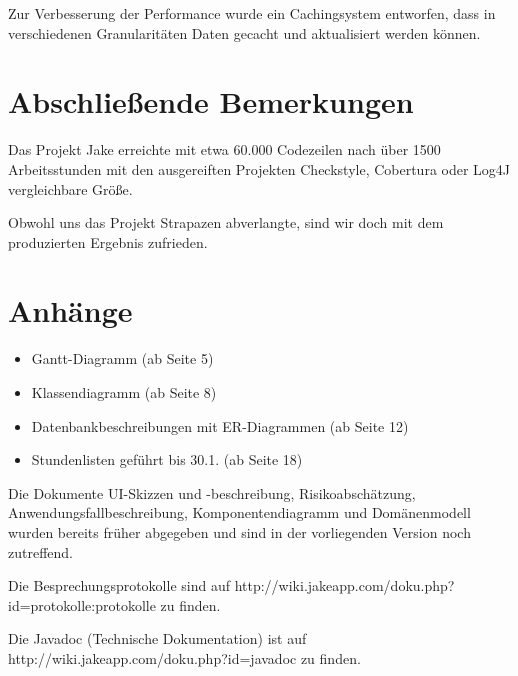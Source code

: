 Zur Verbesserung der Performance wurde ein Cachingsystem entworfen, dass in verschiedenen Granularitäten Daten gecacht und aktualisiert werden können.


\section{Abschließende Bemerkungen}
Das Projekt Jake erreichte mit etwa 60.000 Codezeilen nach über 1500 Arbeitsstunden mit den ausgereiften Projekten Checkstyle, Cobertura oder Log4J vergleichbare Größe.

Obwohl uns das Projekt Strapazen abverlangte, sind wir doch mit dem produzierten Ergebnis zufrieden.

\section{Anhänge}
\begin{itemize}
\item Gantt-Diagramm (ab Seite 5)
\item Klassendiagramm (ab Seite 8)
\item Datenbankbeschreibungen mit ER-Diagrammen (ab Seite 12)
\item Stundenlisten geführt bis 30.1. (ab Seite 18)
\end{itemize}

Die Dokumente UI-Skizzen und -beschreibung, Risikoabschätzung, 
Anwendungsfallbeschreibung, Komponentendiagramm und Domänenmodell wurden bereits 
früher abgegeben und sind in der vorliegenden Version noch zutreffend.

Die Besprechungsprotokolle sind auf http://wiki.jakeapp.com/doku.php?id=protokolle:protokolle zu finden. 

Die Javadoc (Technische Dokumentation) ist auf http://wiki.jakeapp.com/doku.php?id=javadoc zu finden. 

